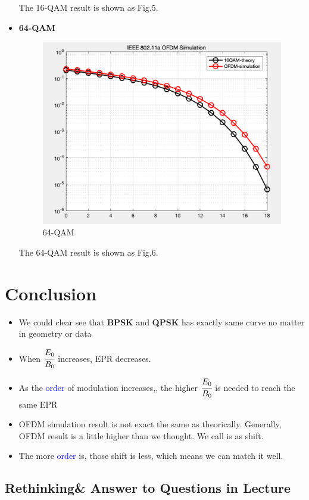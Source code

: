\documentclass{article}
\begin{document}
\begin{itemize}
	The 16-QAM result is shown as Fig.5. 
	\item  
	\textbf{64-QAM}
	\begin{figure}[!h]
		\centering
		\includegraphics[width=0.7\linewidth]{64}
		\caption{64-QAM}
		\label{fig:64}
	\end{figure}
	
	The 64-QAM result is shown as Fig.6. 
\end{itemize}








\section{Conclusion}
\begin{itemize}
	\item We could clear see that \textbf{BPSK} and \textbf{QPSK} has exactly same curve no matter in geometry or data
	\item When $ \cfrac{E_0}{B_0} $ increases, EPR decreases. 
	\item As the \textcolor{blue}{order} of modulation increases,, the higher $ \cfrac{E_0}{B_0} $ is needed to reach the same EPR
	\item OFDM simulation result is not exact the same as theorically. Generally, OFDM result is a little higher than we thought. We call is as shift.
	\item The more \textcolor{blue}{order} is, those shift is less, which means we can match it well.
\end{itemize}
\subsection{Rethinking\& Answer to Questions in Lecture}
\end{document}

